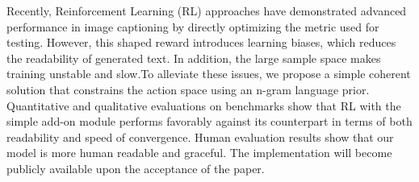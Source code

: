 Recently, Reinforcement Learning (RL) approaches have demonstrated advanced performance in image captioning by directly optimizing the metric used for testing.  However, this shaped reward introduces learning biases, which reduces the readability of generated text.  In addition, the large sample space makes training unstable and slow.To alleviate these issues, we propose a simple coherent solution that constrains the action space using an n-gram language prior.  Quantitative and qualitative evaluations on benchmarks show that RL with the simple add-on module performs favorably against its counterpart in terms of both readability and speed of convergence. Human evaluation results show that our model is more human readable and graceful. The implementation will become publicly available upon the acceptance of the paper.
